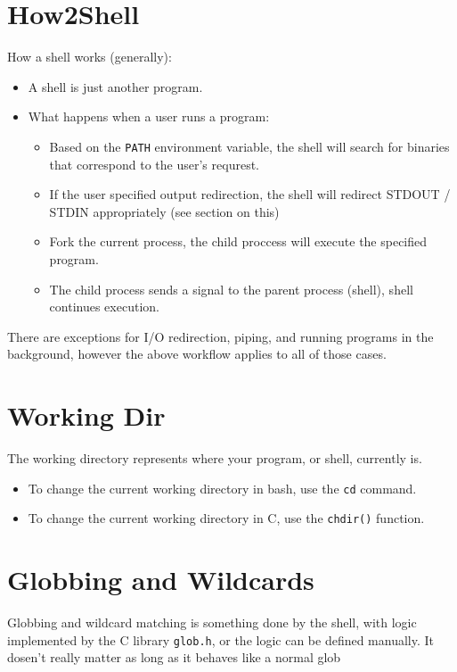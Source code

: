 \section{How2Shell}

How a shell works (generally):
\begin{itemize}
\item A shell is just another program.
\item What happens when a user runs a program:
  \begin{itemize}
  \item Based on the \texttt{PATH} environment variable, the shell will search for
    binaries that correspond to the user's requrest.
  \item If the user specified output redirection, the shell will redirect STDOUT
    / STDIN appropriately (see section on this)
  \item Fork the current process, the child proccess will execute the specified
    program.
  \item The child process sends a signal to the parent process (shell), shell
    continues execution.
  \end{itemize}
\end{itemize}
There are exceptions for I/O redirection, piping, and running programs in the
background, however the above workflow applies to all of those cases.

\section{Working Dir}

The working directory represents where your program, or shell, currently is.
\begin{itemize}
\item To change the current working directory in bash, use the \texttt{cd}
  command.
\item To change the current working directory in C, use the \texttt{chdir()} function.
\end{itemize}

\section{Globbing and Wildcards}

Globbing and wildcard matching is something done by the shell, with logic
  implemented by the C library \texttt{glob.h}, or the logic can be defined
  manually. It dosen't really matter as long as it behaves like a normal glob

